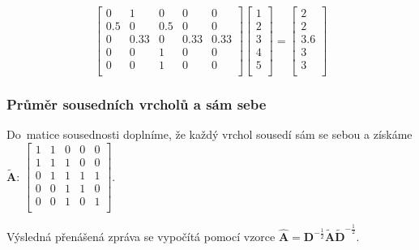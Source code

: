 $$
\left[ \begin{matrix}
0 & 1 & 0 & 0 & 0 \\
0.5 & 0 & 0.5 & 0 & 0 \\
0 & 0.33 & 0 & 0.33 & 0.33 \\
0 & 0 & 1 & 0 & 0 \\
0 & 0 & 1 & 0 & 0 \\
\end{matrix} \right]
\left[ \begin{matrix}
1 \\
2 \\
3 \\
4 \\
5 \\
\end{matrix} \right] = 
\left[ \begin{matrix}
2 \\
2 \\
3.6 \\
3 \\
3 \\
\end{matrix} \right] 
$$

\subsubsection{Průměr sousedních vrcholů a sám sebe}

Do~matice sousednosti doplníme, že každý vrchol sousedí sám se sebou a získáme $\mathbf{\tilde{A}}$:
$\left[ \begin{matrix}
1 & 1 & 0 & 0 & 0 \\
1 & 1 & 1 & 0 & 0 \\
0 & 1 & 1 & 1 & 1 \\
0 & 0 & 1 & 1 & 0 \\
0 & 0 & 1 & 0 & 1 \\
\end{matrix} \right]$.

Výsledná přenášená zpráva se vypočítá pomocí vzorce
$\mathbf{\hat{A}} = \mathbf{D}^{-\frac{1}{2}}\mathbf{\tilde{A}}\mathbf{\tilde{D}}^{-\frac{1}{2}}$.
